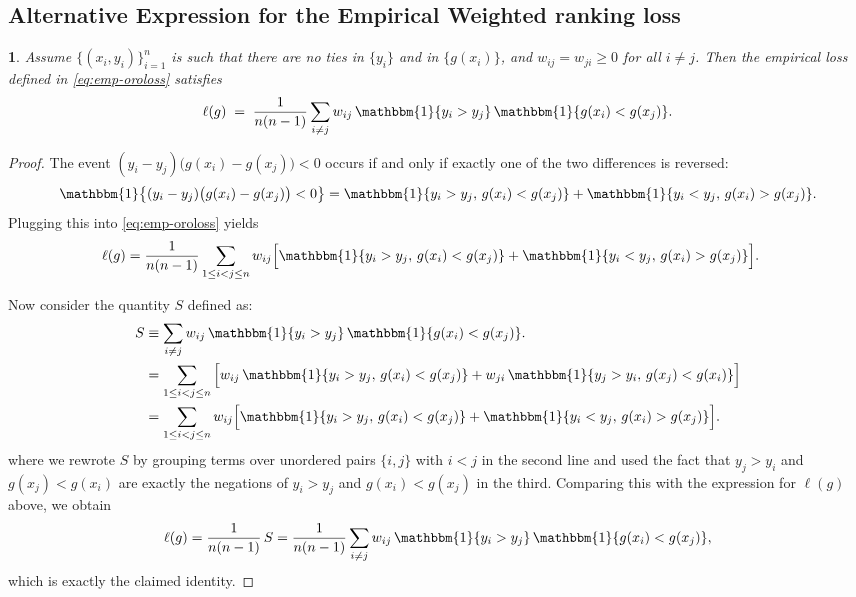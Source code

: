 \documentclass[11pt]{article}
\theoremstyle{plain}
\theoremstyle{plain}
\theoremstyle{plain}
\newtheorem{proposition}{\protect\propositionname}
\theoremstyle{plain}
\theoremstyle{plain}
\theoremstyle{plain}
\theoremstyle{plain}
\providecommand{\propositionname}{Proposition}
\begin{document}
\subsection{Alternative Expression for the Empirical Weighted ranking loss}
\label{app:emp-oroloss-eq}

\begin{proposition}
\label{prop:emp-oroloss-eq}
Assume $\{(x_i,y_i)\}_{i=1}^n$ is such that there are no ties in $\{y_i\}$ and in $\{g(x_i)\}$, and $w_{ij}=w_{ji}\ge 0$ for all $i\ne j$. Then the empirical loss defined in \eqref{eq:emp-oroloss} satisfies
\[
    \ell(g)
    \;=\;
    \frac{1}{n(n-1)}\sum_{i\ne j}
    w_{ij}\,
    \mathbbm{1}\{y_i>y_j\}\,\mathbbm{1}\{g(x_i)<g(x_j)\}.
\]
\end{proposition}

\begin{proof}
The event $(y_i-y_j)\big(g(x_i)-g(x_j)\big)<0$ occurs if and only if exactly one of the two differences is reversed:
\[
\mathbbm{1}\!\left\{(y_i-y_j)\big(g(x_i)-g(x_j)\big)<0\right\}
=
\mathbbm{1}\{y_i>y_j,\,g(x_i)<g(x_j)\}
+\mathbbm{1}\{y_i<y_j,\,g(x_i)>g(x_j)\}.
\]
Plugging this into \eqref{eq:emp-oroloss} yields
\begin{align*}
\ell(g)
&= \frac{1}{n(n-1)}\sum_{1\le i<j\le n}
    w_{ij}\Big[
    \mathbbm{1}\{y_i>y_j,\,g(x_i)<g(x_j)\}
    +\mathbbm{1}\{y_i<y_j,\,g(x_i)>g(x_j)\}
    \Big].
\end{align*}

Now consider the quantity $S$ defined as:
\begin{align*}
    S
&\equiv \sum_{i\ne j}
    w_{ij}\,
    \mathbbm{1}\{y_i>y_j\}\,\mathbbm{1}\{g(x_i)<g(x_j)\}.\\
    &= \sum_{1\le i<j\le n}
\Big[
    w_{ij}\,\mathbbm{1}\{y_i>y_j,\,g(x_i)<g(x_j)\}
    +
    w_{ji}\,\mathbbm{1}\{y_j>y_i,\,g(x_j)<g(x_i)\} \Big] \\
    &= \sum_{1\le i<j\le n}
w_{ij}\Big[
    \mathbbm{1}\{y_i>y_j,\,g(x_i)<g(x_j)\}
    +\mathbbm{1}\{y_i<y_j,\,g(x_i)>g(x_j)\}
\Big].
\end{align*}
where we rewrote $S$ by grouping terms over unordered pairs $\{i,j\}$ with $i<j$ in the second line and used the fact that $y_j>y_i$ and $g(x_j)<g(x_i)$ are exactly the negations of $y_i>y_j$ and $g(x_i)<g(x_j)$ in the third. Comparing this with the expression for $\ell(g)$ above, we obtain
\[
\ell(g)
= \frac{1}{n(n-1)}\,S
= \frac{1}{n(n-1)}\sum_{i\ne j}
    w_{ij}\,
    \mathbbm{1}\{y_i>y_j\}\,\mathbbm{1}\{g(x_i)<g(x_j)\},
\]
which is exactly the claimed identity.
\end{proof}
\end{document}
